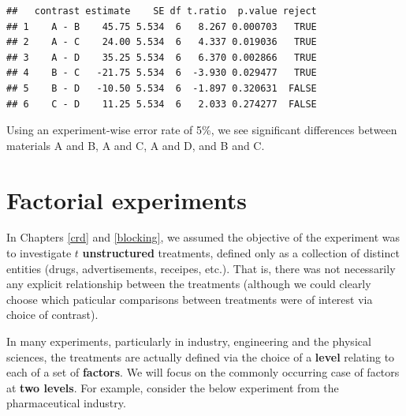 \documentclass[
]{book}
\theoremstyle{definition}
\theoremstyle{definition}
\theoremstyle{definition}
\theoremstyle{definition}
\theoremstyle{remark}
\begin{document}
\begin{enumerate}
\begin{verbatim}
##   contrast estimate    SE df t.ratio  p.value reject
## 1    A - B    45.75 5.534  6   8.267 0.000703   TRUE
## 2    A - C    24.00 5.534  6   4.337 0.019036   TRUE
## 3    A - D    35.25 5.534  6   6.370 0.002866   TRUE
## 4    B - C   -21.75 5.534  6  -3.930 0.029477   TRUE
## 5    B - D   -10.50 5.534  6  -1.897 0.320631  FALSE
## 6    C - D    11.25 5.534  6   2.033 0.274277  FALSE
\end{verbatim}
\end{enumerate}

Using an experiment-wise error rate of 5\%, we see significant differences between materials A and B, A and C, A and D, and B and C.

\hypertarget{factorial}{%
\chapter{Factorial experiments}\label{factorial}}

In Chapters \ref{crd} and \ref{blocking}, we assumed the objective of the experiment was to investigate \(t\) \textbf{unstructured} treatments, defined only as a collection of distinct entities (drugs, advertisements, receipes, etc.). That is, there was not necessarily any explicit relationship between the treatments (although we could clearly choose which paticular comparisons between treatments were of interest via choice of contrast).

In many experiments, particularly in industry, engineering and the physical sciences, the treatments are actually defined via the choice of a \textbf{level} relating to each of a set of \textbf{factors}. We will focus on the commonly occurring case of factors at \textbf{two levels}. For example, consider the below experiment from the pharmaceutical industry.
\end{document}
